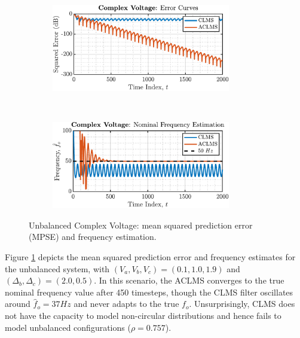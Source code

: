 \begin{enumerate}[label=\alph*), leftmargin=*]
\begin{figure}[h]
    \centering
    \begin{subfigure}{0.49\textwidth}
        \centering
        \includegraphics[height=1.5in]{report/widely-linear-filtering-and-adaptive-spectrum-estimation/complex-LMS-and-widely-linear-modelling/assets/e/unbalanced_error}
    \end{subfigure}
    ~
    \begin{subfigure}{0.49\textwidth}
        \centering
        \includegraphics[height=1.5in]{report/widely-linear-filtering-and-adaptive-spectrum-estimation/complex-LMS-and-widely-linear-modelling/assets/e/unbalanced_frequency}
    \end{subfigure}
    \caption{Unbalanced Complex Voltage: mean squared prediction error (MPSE) and frequency estimation.}
    \label{fig:4_1_e_2}
\end{figure}

Figure \ref{fig:4_1_e_2} depicts the mean squared prediction error and frequency estimates for the unbalanced system,
with $(V_{a}, V_{b}, V_{c}) = (0.1, 1.0, 1.9)$ and $(\Delta_{b}, \Delta_{c}) = (2.0, 0.5)$.
In this scenario, the ACLMS converges to the true nominal frequency value after 450 timesteps, though the CLMS filter oscillates around $\hat{f}_{o} = 37 Hz$ and never adapts to the true $f_{o}$.
Unsurprisingly, CLMS does not have the capacity to model non-circular distributions and hence fails to model unbalanced configurations ($\rho = 0.757$).

%
\end{enumerate}